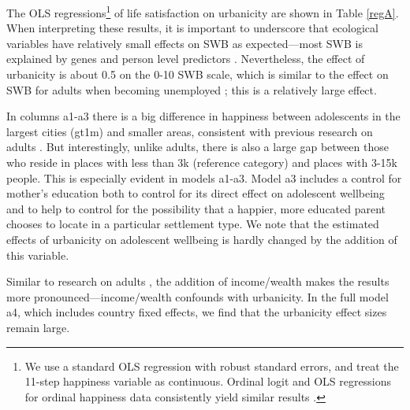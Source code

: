 \documentclass[10pt, letterpaper]{article}
\begin{document}
\begin{spacing}{1.4}
The OLS regressions\footnote{We use a standard OLS regression with robust
  standard errors, and treat the 11-step happiness variable as
  continuous. Ordinal logit and OLS regressions for ordinal  happiness data consistently yield similar results \citep{carbonell04}.
%                                                                                                                  
} of life satisfaction on urbanicity are shown in Table \ref{regA}.
When interpreting these results, it is important to underscore that ecological
variables have relatively small effects on SWB as
 expected---most SWB is explained by genes \citep{schnittker08} and person level
 predictors \citep{veenhoven14b}. Nevertheless, the effect of urbanicity is
 about 0.5 on the 0-10 SWB scale,  which is similar to the
effect on SWB for adults when becoming unemployed \citep{clark2008lags}; this is 
a relatively large effect. 
   
In columns a1-a3 %
there is a big difference in happiness between adolescents in the largest cities (gt1m) and smaller areas, consistent with previous research on adults \citep{aok-ls_fisher16}. But interestingly, unlike adults,
there is also a large gap between those who reside in places with less than 3k
(reference category) and places with 3-15k people. This is especially evident in
models a1-a3. %
 Model a3 includes a control for mother's education both to control for its
 direct effect on adolescent wellbeing and to help to control for the
 possibility that a happier, more educated parent chooses to locate in a
 particular settlement type. We note that the estimated effects of urbanicity on
 adolescent wellbeing is hardly changed by the addition of this variable. 


Similar to research on adults \citep{aok21}, the addition of income/wealth makes
the results more pronounced---income/wealth confounds with urbanicity.
In the full model a4, which includes country fixed effects, we find that the urbanicity effect sizes remain large.


\end{spacing}
\end{document}
